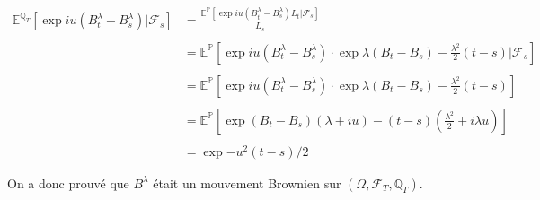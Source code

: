 \documentclass[a4paper,10pt]{report}
\begin{document}
$$
\begin{aligned}
\mathbb{E}^{\mathbb{Q}_T}\left[\exp{i u (B_t^{\lambda}-B_s^{\lambda})} | \mathcal{F}_s\right] &= \frac{ \mathbb{E}^{\mathbb{P}}\left[\exp{i u\left(B_t^{\lambda}-B_s^{\lambda}\right)} L_t | \mathcal{F}_s\right] }{L_s} \\
&& \\
&=\mathbb{E}^{\mathbb{P}}\left[\exp{i u (B_t^{\lambda}-B_s^{\lambda} )} \cdot \exp{\lambda (B_t-B_s )-\frac{\lambda^2}{2}(t-s)} | \mathcal{F}_s\right] \\
&&\\
&=\mathbb{E}^{\mathbb{P}}\left[\exp{i u (B_{t}^{\lambda}-B_{s}^{\lambda} )} \cdot \exp{\lambda (B_{t}-B_{s} )-\frac{\lambda^{2}}{2}(t-s)}\right] \\
&& \\
&=\mathbb{E}^{\mathbb{P}}\left[\exp{(B_{t}-B_{s}) (\lambda+i u)-(t-s)\left(\frac{\lambda^{2}}{2}+i \lambda u\right)}\right] \\
&& \\
&=\exp{-u^2(t-s) / 2}
\end{aligned}
$$

On a donc prouvé que $B^\lambda$ était un mouvement Brownien sur $(\Omega, \mathcal{F}_T, \mathbb{Q}_T)$.
\end{document}
